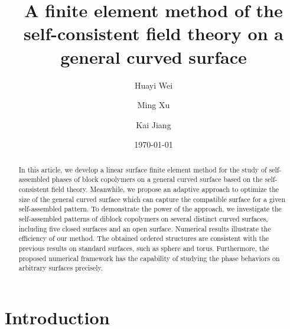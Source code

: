 \documentclass[final,1p,times]{elsarticle}
\begin{document}
\title{
A finite element method of the self-consistent field theory
on a general curved surface}

\author{Huayi Wei}
\author{Ming Xu}
\author{Kai Jiang}
\address{
 School of Mathematics and Computational Science, Xiangtan
 University, Xiangtan, Hunan, P.R. China, 411105,
 \\
Hunan Key Laboratory for Computation and Simulation in Science and Engineering
 }

\date{\today}

\begin{abstract}
    In this article, we develop a linear surface finite element
	method for the study of self-assembled phases of block
	copolymers on a general curved surface based on the
	self-consistent field theory. Meanwhile, we propose an
    adaptive approach to optimize the size of the general curved surface
    which can capture the compatible surface for a given self-assembled
    pattern.  To demonstrate the power of the approach, we investigate the
    self-assembled patterns of diblock copolymers on several distinct curved
    surfaces, including five closed surfaces and an open surface.  Numerical results
    illustrate the efficiency of our method.  The obtained ordered structures
    are consistent with the previous results on standard surfaces, such as
    sphere and torus. Furthermore, the proposed numerical framework has the
    capability of studying the phase behaviors on arbitrary surfaces precisely. 
\end{abstract}


\maketitle

\section{Introduction}
\label{sec:intrd}
\end{document}
